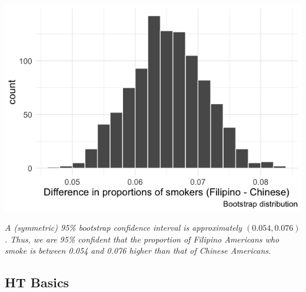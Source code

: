 \documentclass[12pt]{article}   	%
\newcommand{\soln}[2]{\textit{\textcolor{custom_red}{#2}}}{}
\begin{document}
\begin{enumerate}
\begin{enumerate}
    \includegraphics[scale = 0.4]{images/14-asian-tobacco-boot.png}
    
    \soln{}{A (symmetric) 95\% bootstrap confidence interval is approximately $(0.054, 0.076)$. Thus, we are 95\% confident that the proportion of Filipino Americans who smoke is between 0.054 and 0.076 higher than that of Chinese Americans.  }
  \end{enumerate}
\end{enumerate}

\subsection*{HT Basics}
\end{document}
